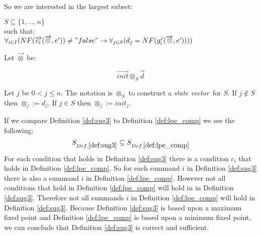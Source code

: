 \documentclass[a4paper,10pt]{article}
\newcommand{\ovr}{\overrightarrow}
\newcommand{\sv}{\textit{state vector}}
\begin{document}
\begin{defn} \label{def:sug3} So we are interested in the largest subset:

\begin{flushleft}
$ S \subseteq \lbrace 1, \ldots, n \rbrace $ \\

such that:\\

$\forall_{i \in I} (NF( \ovr{c_i} ( \ovr{\otimes}, e' ) ) \not= "false" \rightarrow \forall_{j \in S}(d_j =  NF( g_i^j(\ovr{\otimes}, e' )))) $
\end{flushleft}
 
\begin{defn} \label{def:otimes} Let $\ovr{\otimes}$ be:

\begin{displaymath}
\ovr{init} \otimes_S \ovr{d}
\end{displaymath}

\end{defn}
Let $j$ be $ 0 < j\leqslant n$. The notation is $\otimes_S$ to construct a \sv\ for $S$. 
If $j \not\in S$ then $\otimes_j := d_j$. If $j \in S$ then $\otimes_j := init_j$.

If we compare Definition \ref{def:sug3} to Definition \ref{def:lpe_comp} we see the following: 
$$S_{Def. \ref{def:sug3}} \subseteq S_{Def. \ref{def:lpe_comp}} $$  
For each condition that holds in Definition \ref{def:sug3} there is a condition $c_i$ that holds in Definition \ref{def:lpe_comp}. So for each summand $i$ in Definition \ref{def:sug3} there is also a summand $i$ in Definition \ref{def:lpe_comp}. However not all conditions that hold in Definition \ref{def:lpe_comp} will hold in in Definition \ref{def:sug3}. Therefore 
not all summands $i$ in Definition \ref{def:lpe_comp} will hold in Definition \ref{def:sug3}. Because Definition \ref{def:sug3} is based upon a maximum fixed point and Definition \ref{def:lpe_comp} is based upon a minimum fixed point, we can conclude that Definition \ref{def:sug3} is correct and sufficient.

\end{defn}
\end{document}

